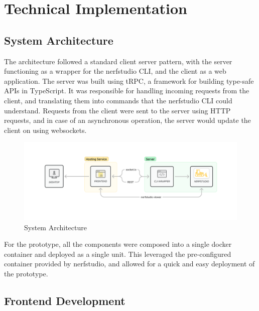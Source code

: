 %
\chapter{Technical Implementation}
\label{sec:system}

\section{System Architecture}
\label{sec:system:architecture}


The architecture followed a standard client server pattern, with the server functioning as a wrapper for the nerfstudio CLI, and the client as a web application.
The server was built using tRPC, a framework for building type-safe APIs in TypeScript.
It was responsible for handling incoming requests from the client, and translating them into commands that the nerfstudio CLI could understand.
Requests from the client were sent to the server using HTTP requests, and in case of an asynchronous operation, the server would update the client on using websockets.

\begin{figure}[htb]
	\includegraphics[width=\textwidth]{figures/architecture-1.png}
	\caption{System Architecture}
	\label{fig:system:example2}
\end{figure}

For the prototype, all the components were composed into a single docker container and deployed as a single unit.
This leveraged the pre-configured container provided by nerfstudio, and allowed for a quick and easy deployment of the prototype.

\section{Frontend Development} 
\label{sec:system:frontend}


